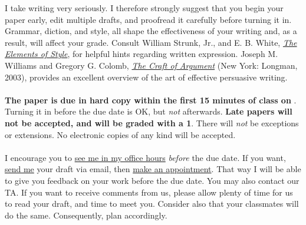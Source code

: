 \documentclass[letterpaper]{article}
\begin{document}
\begin{enumerate}
	I take writing very seriously. I therefore strongly suggest that you begin your paper early, edit multiple drafts, and proofread it carefully before turning it in. Grammar, diction, and style, all shape the effectiveness of your writing and, as a result, will affect your grade. Consult William Strunk, Jr., and E. B. White, \href{http://www.jlakes.org/ch/web/The-elements-of-style.pdf}{\emph{The Elements of Style}}, for helpful hints regarding written expression. Joseph M. Williams and Gregory G. Colomb, \href{http://sir.spbu.ru/en/programs/master/master_program_in_international_relations/digital_library/Book%20Research%20seminar%20by%20Booth.pdf}{\emph{The Craft of Argument}} (New York: Longman, 2003), provides an excellent overview of the art of effective persuasive writing.
	\\ 
	\\
	{\bf The paper is due in hard copy within the first 15 minutes of class on} {\bf {\unskip}}. Turning it in before the due date is OK, but \emph{not} afterwards. {\bf Late papers will not be accepted, and will be graded with a 1}. There will \emph{not} be exceptions or extensions. No electronic copies of any kind will be accepted.
	\\
	\\
	I encourage you to \href{https://calendly.com/bahamonde/officehours}{see me in my office hours} \emph{before} the due date. If you want, \href{mailto:\filetext}{send me} your draft via email, then \href{https://calendly.com/bahamonde/officehours}{make an appointment}. That way I will be able to give you feedback on your work before the due date. You may also contact our TA. If you want to receive comments from us, please allow plenty of time for us to read your draft, and time to meet you. Consider also that your classmates will do the same. Consequently, plan accordingly.


\end{enumerate}
\end{document}
